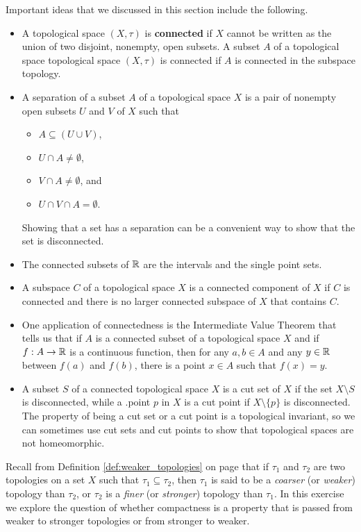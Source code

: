 \label{sec_connect_top_summ}
Important ideas that we discussed in this section include the following.
\begin{itemize}
\item A topological space $(X,\tau)$ is \textbf{connected} if $X$ cannot be written as the union of two disjoint, nonempty, open subsets. A subset $A$ of a topological space topological space $(X,\tau)$ is connected if $A$ is connected in the subspace topology. 
\item A separation of a subset $A$ of a topological space $X$ is a pair of nonempty open subsets $U$ and $V$ of $X$ such that 
\begin{itemize}
\item $A \subseteq (U \cup V)$,
\item $U \cap A \neq \emptyset$, 
\item $V \cap A \neq \emptyset$, and
\item $U \cap V \cap A = \emptyset$.
\end{itemize}
Showing that a set has a separation can be a convenient way to show that the set is disconnected.
\item The connected subsets of $\mathbb{R}$ are the intervals and the single point sets.
\item A subspace $C$ of a topological space $X$ is a connected component of $X$ if $C$ is connected and there is no larger connected subspace of $X$ that contains $C$.
\item One application of connectedness is the Intermediate Value Theorem that tells us that if $A$ is a connected subset of a topological space $X$ and if $f : A \to \mathbb{R}$ is a continuous function, then for any $a,b \in A$ and any $y \in \mathbb{R}$ between $f(a)$ and $f(b)$, there is a point $x \in A$ such that $f(x) = y$. 
\item A subset $S$ of a connected topological space $X$ is a cut set of $X$ if the set $X \setminus S$ is disconnected, while a .point $p$ in $X$ is a cut point if $X \setminus \{p\}$ is disconnected. The property of being a cut set or a cut point is a topological invariant, so we can sometimes use cut sets and cut points to show that topological spaces are not homeomorphic.
\end{itemize}

\label{sec_connect_top_exer}

\be

\item Recall from Definition \ref{def:weaker_topologies} on page \pageref{def:weaker_topologies} that if $\tau_1$ and $\tau_2$ are two topologies on a set $X$ such that $\tau_1 \subseteq \tau_2$, then $\tau_1$ is said to be a \emph{coarser} (or \emph{weaker}) topology than $\tau_2$, or $\tau_2$ is a \emph{finer} (or \emph{stronger}) topology than $\tau_1$. In this exercise we explore the question of whether compactness is a property that is passed from weaker to stronger topologies or from stronger to weaker. 

